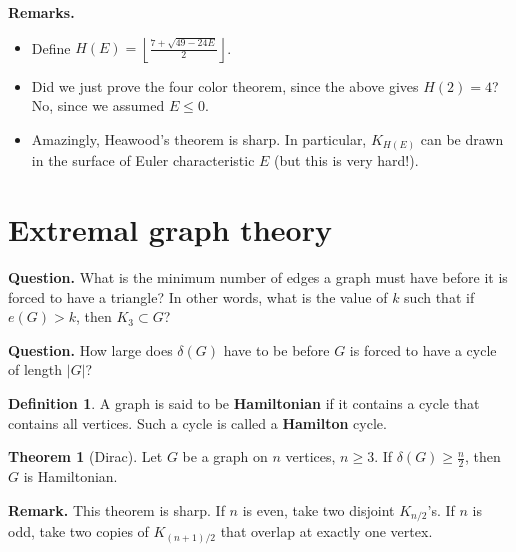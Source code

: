 \documentclass{article}
\theoremstyle{definition}
\newtheorem{theorem}{Theorem}[section]
\newtheorem{defn}{Definition}[section]
\begin{document}
\textbf{Remarks.} 
\begin{itemize}
    \item Define $H(E) = \left\lfloor \frac{7+\sqrt{49-24E}}{2} \right\rfloor$.
    \item Did we just prove the four color theorem, since the above gives $H(2)=4$? No, since we assumed $E\le 0$.
    \item Amazingly, Heawood's theorem is sharp. In particular, $K_{H(E)}$ can be drawn in the surface of Euler characteristic $E$ (but this is very hard!).
\end{itemize}

\section{Extremal graph theory}

\textbf{Question.} What is the minimum number of edges a graph must have before it is forced to have a triangle? In other words, what is the value of $k$ such that if $e(G) > k$, then $K_3 \subset G$?
\vspace{1mm}

\textbf{Question.} How large does $\delta(G)$ have to be before $G$ is forced to have a cycle of length $|G|$?


\begin{defn}
    A graph is said to be \textbf{Hamiltonian} if it contains a cycle that contains all vertices. Such a cycle is called a \textbf{Hamilton} cycle.
\end{defn}
\begin{theorem}[Dirac]
    Let $G$ be a graph on $n$ vertices, $n \ge 3$. If $\delta(G)\ge \frac{n}{2}$, then $G$ is Hamiltonian.
\end{theorem}
\textbf{Remark.} This theorem is sharp. If $n$ is even, take two disjoint $K_{n/2}$'s. If $n$ is odd, take two copies of $K_{(n+1)/2}$ that overlap at exactly one vertex.
\end{document}
